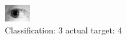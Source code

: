 \begin{figure}[h!]
\begin{center}
\includegraphics[width=0.60\columnwidth]{figures/ID1212_class_3_target_4.png}
\end{center}
\caption{ Classification: 3 actual target: 4}
\label{fig:ID1212_class_3_target_4}
\end{figure}
